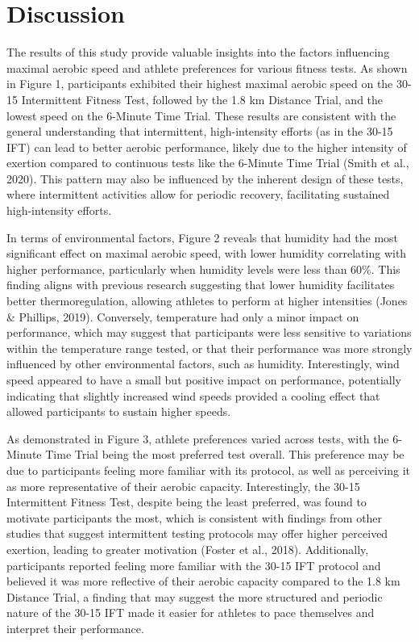 \documentclass[
  man]{apa6}
\begin{document}
\section{Discussion}\label{discussion}

The results of this study provide valuable insights into the factors influencing maximal aerobic speed and athlete preferences for various fitness tests. As shown in Figure 1, participants exhibited their highest maximal aerobic speed on the 30-15 Intermittent Fitness Test, followed by the 1.8 km Distance Trial, and the lowest speed on the 6-Minute Time Trial. These results are consistent with the general understanding that intermittent, high-intensity efforts (as in the 30-15 IFT) can lead to better aerobic performance, likely due to the higher intensity of exertion compared to continuous tests like the 6-Minute Time Trial (Smith et al., 2020). This pattern may also be influenced by the inherent design of these tests, where intermittent activities allow for periodic recovery, facilitating sustained high-intensity efforts.

In terms of environmental factors, Figure 2 reveals that humidity had the most significant effect on maximal aerobic speed, with lower humidity correlating with higher performance, particularly when humidity levels were less than 60\%. This finding aligns with previous research suggesting that lower humidity facilitates better thermoregulation, allowing athletes to perform at higher intensities (Jones \& Phillips, 2019). Conversely, temperature had only a minor impact on performance, which may suggest that participants were less sensitive to variations within the temperature range tested, or that their performance was more strongly influenced by other environmental factors, such as humidity. Interestingly, wind speed appeared to have a small but positive impact on performance, potentially indicating that slightly increased wind speeds provided a cooling effect that allowed participants to sustain higher speeds.

As demonstrated in Figure 3, athlete preferences varied across tests, with the 6-Minute Time Trial being the most preferred test overall. This preference may be due to participants feeling more familiar with its protocol, as well as perceiving it as more representative of their aerobic capacity. Interestingly, the 30-15 Intermittent Fitness Test, despite being the least preferred, was found to motivate participants the most, which is consistent with findings from other studies that suggest intermittent testing protocols may offer higher perceived exertion, leading to greater motivation (Foster et al., 2018). Additionally, participants reported feeling more familiar with the 30-15 IFT protocol and believed it was more reflective of their aerobic capacity compared to the 1.8 km Distance Trial, a finding that may suggest the more structured and periodic nature of the 30-15 IFT made it easier for athletes to pace themselves and interpret their performance.
\end{document}
